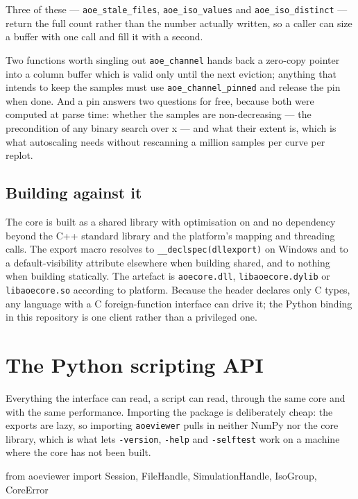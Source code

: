 \documentclass[11pt,a4paper,oneside]{report}
\newcommand{\code}[1]{\texttt{#1}}
\begin{document}
Three of these --- \code{aoe\_stale\_files}, \code{aoe\_iso\_values} and
\code{aoe\_iso\_distinct} --- return the full count rather than the number
actually written, so a caller can size a buffer with one call and fill it with a
second.

\begin{aoenote}{Two functions worth singling out}
\code{aoe\_channel} hands back a zero-copy pointer into a column buffer which is
valid only until the next eviction; anything that intends to keep the samples
must use \code{aoe\_channel\_pinned} and release the pin when done. And a pin
answers two questions for free, because both were computed at parse time:
whether the samples are non-decreasing --- the precondition of any binary search
over x --- and what their extent is, which is what autoscaling needs without
rescanning a million samples per curve per replot.
\end{aoenote}

\section{Building against it}

The core is built as a shared library with optimisation on and no dependency
beyond the C++ standard library and the platform's mapping and threading calls.
The export macro resolves to \code{\_\_declspec(dllexport)} on Windows and to a
default-visibility attribute elsewhere when building shared, and to nothing when
building statically. The artefact is \code{aoecore.dll},
\code{libaoecore.dylib} or \code{libaoecore.so} according to platform. Because
the header declares only C types, any language with a C foreign-function
interface can drive it; the Python binding in this repository is one client
rather than a privileged one.

\chapter{The Python scripting API}
\label{ch:scripting}

Everything the interface can read, a script can read, through the same core and
with the same performance. Importing the package is deliberately cheap: the
exports are lazy, so importing \code{aoeviewer} pulls in neither NumPy nor the
core library, which is what lets \code{-version}, \code{-help} and
\code{-selftest} work on a machine where the core has not been built.

\begin{aoecode}
from aoeviewer import Session, FileHandle, SimulationHandle, IsoGroup, CoreError
\end{aoecode}
\end{document}
